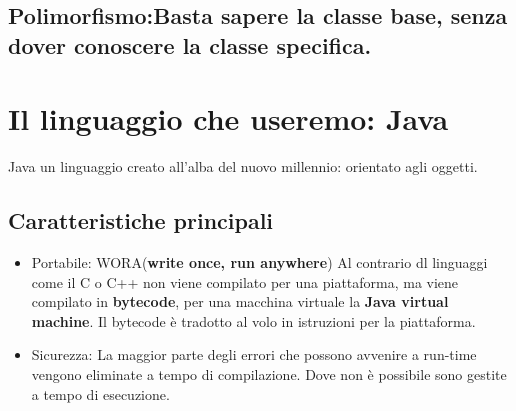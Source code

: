 \documentclass[11pt]{article}
\begin{document}
\subsection{Polimorfismo:Basta sapere la classe base, senza dover conoscere la classe specifica.}
\label{sec:orga114803}
\section{Il linguaggio che useremo: Java}
\label{sec:orgfd3026e}
Java un linguaggio creato all'alba del nuovo millennio: orientato agli oggetti.
\subsection{Caratteristiche principali}
\label{sec:orgc10214c}
\begin{itemize}
\item Portabile: WORA(\textbf{write once, run anywhere})
Al contrario dl linguaggi come il  C o C++ non viene compilato per una piattaforma, ma viene compilato in \textbf{bytecode}, per una macchina virtuale la \textbf{Java virtual machine}. Il bytecode è tradotto al volo in istruzioni per la piattaforma.
\item Sicurezza: La maggior parte degli errori che possono avvenire a run-time vengono eliminate a tempo di compilazione. Dove non è possibile sono gestite a tempo di esecuzione.
\end{itemize}
\end{document}
